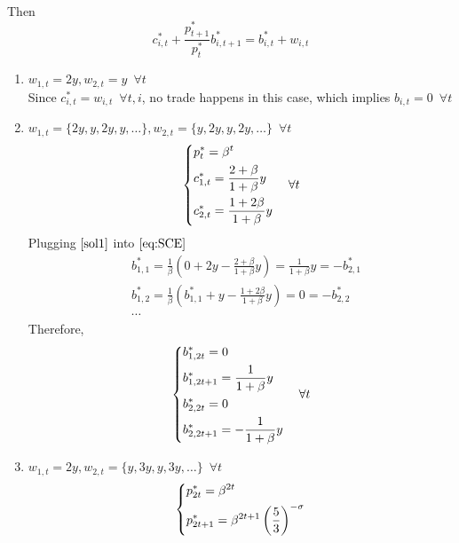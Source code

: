 \documentclass{article}
\begin{document}
\begin{enumerate}
        Then
        \begin{equation}
            c_{i,t}^\ast+\frac{p_{t+1}^\ast}{p_{t}^\ast}b_{i,t+1}^\ast= b_{i,t}^\ast+w_{i,t}\label{eq:SCE}
        \end{equation}
        \begin{enumerate}
            \item $w_{1,t}=2y,w_{2,t}=y\enspace\forall t$\\
            Since $c_{i,t}^\ast=w_{i,t}\enspace\forall t,i$, no trade happens in this case, which implies $b_{i,t}=0\enspace\forall t$
            \item $w_{1,t}=\{2y,y,2y,y,\dots\},w_{2,t}=\{y,2y,y,2y,\dots\}\enspace\forall t$
            \begin{equation}
                \begin{dcases}
                    p_t^\ast=\beta^t\\
                    c_{1,t}^\ast=\frac{2+\beta}{1+\beta}y\\
                    c_{2,t}^\ast=\frac{1+2\beta}{1+\beta}y
                \end{dcases}\quad\forall t\label{sol1}
            \end{equation}
            Plugging \(\eqref{sol1}\) into \(\eqref{eq:SCE}\)
            \begin{align*}
                &b_{1,1}^\ast=\frac{1}{\beta}(0+2y-\frac{2+\beta}{1+\beta}y)=\frac{1}{1+\beta}y=-b_{2,1}^\ast\\
                &b_{1,2}^\ast=\frac{1}{\beta}(b_{1,1}^\ast+y-\frac{1+2\beta}{1+\beta}y)=0=-b_{2,2}^\ast\\
                &\cdots
            \end{align*}
            Therefore,
            \[\begin{dcases}
                b_{1,2t}^\ast=0\\
                b_{1,2t+1}^\ast=\frac{1}{1+\beta}y\\
                b_{2,2t}^\ast=0\\
                b_{2,2t+1}^\ast=-\frac{1}{1+\beta}y
            \end{dcases}\quad\forall t\]
            \item $w_{1,t}=2y,w_{2,t}=\{y,3y,y,3y,\dots\}\enspace\forall t$
            \begin{equation}
                \begin{dcases}
                    p_{2t}^\ast=\beta^{2t}\\
                    p_{2t+1}^\ast=\beta^{2t+1}\left(\frac{5}{3}\right)^{-\sigma}\\

\end{dcases}
\end{equation}
\end{enumerate}
\end{enumerate}
\end{document}
